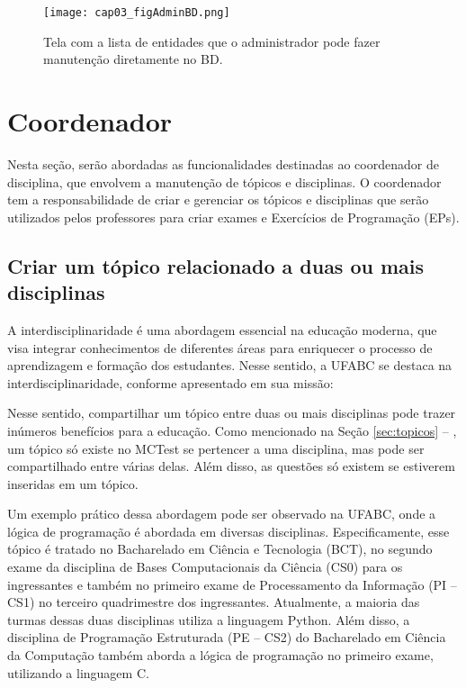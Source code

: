 \begin{figure}[!ht]
  \centering
  \texttt{[image: cap03\_figAdminBD.png]}
  \caption{Tela com a lista de entidades que o administrador pode fazer manutenção diretamente no BD.}
  \label{fig:cap03_figAdminBD}
\end{figure}


\section{Coordenador}

Nesta seção, serão abordadas as funcionalidades destinadas ao coordenador de disciplina, que envolvem a manutenção de tópicos e disciplinas. O coordenador tem a responsabilidade de criar e gerenciar os tópicos e disciplinas que serão utilizados pelos professores para criar exames e Exercícios de Programação (EPs).

\subsection{Criar um tópico relacionado a duas ou mais disciplinas}

A interdisciplinaridade é uma abordagem essencial na educação moderna, que visa integrar conhecimentos de diferentes áreas para enriquecer o processo de aprendizagem e formação dos estudantes. Nesse sentido, a UFABC se destaca na interdisciplinaridade, conforme apresentado em sua missão:


Nesse sentido, compartilhar um tópico entre duas ou mais disciplinas pode trazer inúmeros benefícios para a educação. Como mencionado na Seção \ref{sec:topicos} -- , um tópico só existe no MCTest se pertencer a uma disciplina, mas pode ser compartilhado entre várias delas. Além disso, as questões só existem se estiverem inseridas em um tópico. 


Um exemplo prático dessa abordagem pode ser observado na UFABC, onde a lógica de programação é abordada em diversas disciplinas. Especificamente, esse tópico é tratado no Bacharelado em Ciência e Tecnologia (BCT), no segundo exame da disciplina de Bases Computacionais da Ciência (CS0) para os ingressantes e também no primeiro exame de Processamento da Informação (PI -- CS1) no terceiro quadrimestre dos ingressantes. Atualmente, a maioria das turmas dessas duas disciplinas utiliza a linguagem Python. Além disso, a disciplina de Programação Estruturada (PE -- CS2) do Bacharelado em Ciência da Computação também aborda a lógica de programação no primeiro exame, utilizando a linguagem C.

